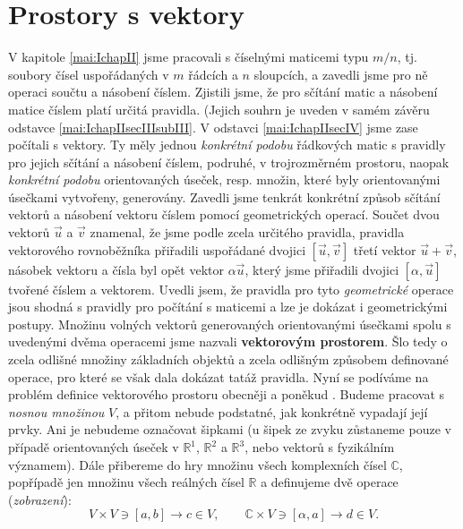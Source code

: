   \section{Prostory s vektory}
    V kapitole \ref{mai:IchapII} jsme pracovali s číselnými maticemi typu \(m/n\), tj. soubory 
    čísel uspořádaných v \(m\) řádcích a \(n\) sloupcích, a zavedli jsme pro ně operaci součtu a 
    násobení číslem. Zjistili jsme, že pro sčítání matic a násobení matice číslem platí určitá 
    pravidla. (Jejich souhrn je uveden v samém závěru odstavce \ref{mai:IchapIIsecIIIsubIII}. V 
    odstavci \ref{mai:IchapIIsecIV} jsme zase počítali s vektory. Ty měly jednou \emph{konkrétní 
    podobu} řádkových matic s pravidly pro jejich sčítání a násobení číslem, podruhé, v 
    trojrozměrném prostoru, naopak \emph{konkrétní podobu} orientovaných úseček, resp. množin, 
    které byly orientovanými úsečkami vytvořeny, generovány. Zavedli jsme tenkrát konkrétní způsob 
    sčítání vektorů a násobení vektoru číslem pomocí geometrických operací. Součet dvou vektorů 
    \(\vec{u}\) a \(\vec{v}\) znamenal, že jsme podle zcela určitého pravidla, pravidla 
    vektorového rovnoběžníka přiřadili uspořádané dvojici \([\vec{u},\vec{v}]\) třetí vektor 
    \(\vec{u} + \vec{v}\), násobek vektoru a čísla byl opět vektor \(\alpha\vec{u}\), který jsme 
    přiřadili dvojici \([\alpha,\vec{u}]\) tvořené číslem a vektorem. Uvedli jsem, že pravidla pro 
    tyto \emph{geometrické} operace jsou shodná s pravidly pro počítání s maticemi a lze je dokázat 
    i geometrickými postupy. Množinu volných vektorů generovaných orientovanými úsečkami spolu s 
    uvedenými dvěma operacemi jsme nazvali \textbf{vektorovým prostorem}. Šlo tedy o zcela odlišné 
    množiny základních objektů a zcela odlišným způsobem definované operace, pro které se však dala 
    dokázat tatáž pravidla. Nyní se podíváme na problém definice vektorového prostoru obecněji a 
    poněkud . Budeme pracovat s \emph{nosnou množinou} \(V\), a přitom nebude podstatné, 
    jak konkrétně vypadají její prvky. Ani je nebudeme označovat šipkami (u šipek ze zvyku 
    zůstaneme pouze v případě orientovaných úseček v \(\mathbb{R}^1\), \(\mathbb{R}^2\) a 
    \(\mathbb{R}^3\), nebo vektorů s fyzikálním významem). Dále přibereme do hry množinu všech 
    komplexních čísel \(\mathbb{C}\), popřípadě jen množinu všech reálných čísel \(\mathbb{R}\) a 
    definujeme dvě operace (\emph{zobrazení}):
    \begin{equation}\label{mai:eq046}
      V \times V \ni [a,b] \longrightarrow c\in V,\qquad 
      \mathbb{C}\times V\ni[\alpha,a] \longrightarrow d\in V.
    \end{equation}
